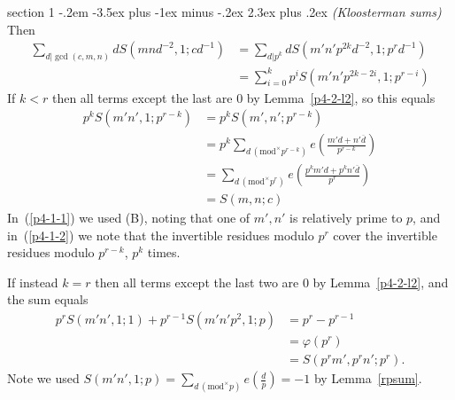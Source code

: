 \documentclass[12pt]{article}
\makeatletter
\theoremstyle{norm}
\newcommand{\ph}[0]{\varphi}
\newcommand{\pa}[1]{\left( {#1} \right)}
\newcommand{\pf}[2]{\pa{\frac{#1}{#2}}}
\newcommand{\ol}[1]{\overline{#1}}
\newcommand{\mmod}[1]{\,(\text{mod}^{\times} #1)}
\newenvironment{problem}{\@startsection
       {section}
       {1}
       {-.2em}
       {-3.5ex plus -1ex minus -.2ex}
       {2.3ex plus .2ex}
       {\pagebreak[3]%
       \large\bf\noindent{Problem }
       }
       }
       {%
       }
\makeatother
\begin{document}
\begin{problem}{\it (Kloosterman sums)}
Then
\begin{align*}
\sum_{d|\gcd(c,m,n)} dS(mnd^{-2},1;cd^{-1})
&=\sum_{d|p^k} dS(m'n'p^{2k}d^{-2},1;p^rd^{-1})\\
&=\sum_{i=0}^k p^iS(m'n'p^{2k-2i},1;p^{r-i})
\end{align*}
If $k<r$ then all terms except the last are 0 by Lemma~\ref{p4-2-l2}, so this equals 
\begin{align}
\label{p4-1-1}
p^kS(m'n',1;p^{r-k})
&=p^kS(m',n';p^{r-k})\\
\nonumber
&=p^k\sum_{d\mmod{p^{r-k}}} e\pf{m'd+n'\ol{d}}{p^{r-k}}\\
\label{p4-1-2}
&=\sum_{d\mmod{p^r}} e\pf{p^km'd+p^kn'\ol{d}}{p^{r}}\\
\nonumber
&=S(m,n;c)
\end{align}
In~(\ref{p4-1-1}) we used (B), noting that one of $m',n'$ is relatively prime to $p$, and in~(\ref{p4-1-2}) we note that the invertible residues modulo $p^r$ cover the invertible residues modulo $p^{r-k}$, $p^k$ times.

If instead $k=r$ then all terms except the last two are 0 by Lemma~\ref{p4-2-l2}, and the sum equals
\begin{align*}
p^rS(m'n',1;1)+p^{r-1}S(m'n'p^2,1;p)
&=
p^r-p^{r-1}\\
&=\ph(p^r)\\
&=S(p^rm',p^rn';p^r).
\end{align*}
Note we used $S(m'n',1;p)=\sum_{d\mmod p}e\pf dp=-1$ by Lemma~\ref{rpsum}.


\end{problem}
\end{document}

